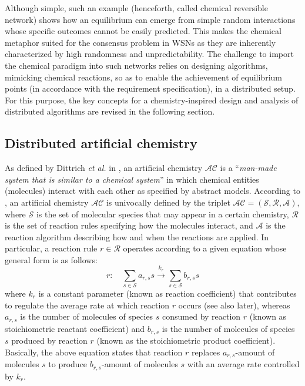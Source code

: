 \documentclass[journal]{IEEEtran}
\newcommand{\artChem}{$\mathcal{AC}$}
\begin{document}
Although simple, such an example (henceforth, called chemical reversible network) shows how an equilibrium can emerge from simple {random interactions whose specific outcomes cannot be easily} predicted. This makes the chemical metaphor suited for the consensus problem in WSNs as they are inherently characterized by high randomness and unpredictability. The challenge to import the chemical paradigm into such networks relies on designing {algorithms, mimicking chemical reactions, so as to enable the achievement of equilibrium points (in accordance with the requirement specification), in a distributed setup}. For this purpose, the key concepts for a chemistry-inspired design and analysis of distributed algorithms are revised in the following section.


\subsection{Distributed artificial chemistry}\label{sec:ArtChem}
As defined by Dittrich \emph{et al.} in \cite{DiZi01}, an artificial chemistry \artChem{} is a ``\emph{man-made system that is similar to a chemical system}'' in which chemical entities (molecules) interact with each other as specified by abstract models.
According to \cite{DiZi01}, an artificial chemistry \artChem{} is univocally defined by the triplet $\mathcal{AC} = (\mathcal{S},\mathcal{R},\mathcal{A})$, where $\mathcal{S}$ is the set of {molecular} species that may appear in a certain chemistry, $\mathcal{R}$ is the set of reaction rules specifying how the molecules interact, and $\mathcal{A}$ is the reaction algorithm describing how and when the reactions are applied. In particular, a reaction rule $r \in\mathcal R$ operates according to a given equation whose general form is as follows:
\begin{equation}\label{eq:reaction}
r: \quad \sum\limits_{s \in \mathcal{S}} a_{r,s} s \mathop \to \limits^{k_r} \sum\limits_{s \in \mathcal{S}} b_{r,s} s
\end{equation}
where $k_r$ {is a constant parameter (known as reaction coefficient) that contributes to regulate the average rate at which reaction $r$ occurs (see also later)}, whereas $a_{r,s}$ is the number of molecules of species $s$ consumed by reaction $r$ (known as stoichiometric reactant coefficient) and $b_{r,s}$ is the number of molecules of species $s$ produced by reaction $r$ (known as the stoichiometric product coefficient). {Basically, the above equation states that reaction $r$ replaces $a_{r,s}$-amount of molecules $s$ to produce $b_{r,s}$-amount of molecules $s$ with an average rate controlled by $k_r$.}
\end{document}

